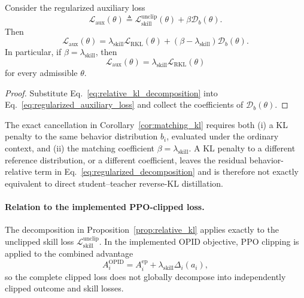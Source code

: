 \documentclass{llmxive}
\begin{document}
\begin{corollary}
\label{cor:matching_kl}
Consider the regularized auxiliary loss
\begin{equation}
 \mathcal L_{\mathrm{aux}}(\theta)
 \triangleq
 \mathcal L_{\mathrm{skill}}^{\mathrm{unclip}}(\theta)
 +
 \beta\mathcal D_b(\theta).
\label{eq:regularized_auxiliary_loss}
\end{equation}
Then
\begin{equation}
 \mathcal L_{\mathrm{aux}}(\theta)
 =
 \lambda_{\mathrm{skill}}
 \mathcal L_{\mathrm{RKL}}(\theta)
 +
 \left(
   \beta-\lambda_{\mathrm{skill}}
 \right)
 \mathcal D_b(\theta).
\label{eq:regularized_decomposition}
\end{equation}
In particular, if
\(\beta=\lambda_{\mathrm{skill}}\), then
\begin{equation*}
 \mathcal L_{\mathrm{aux}}(\theta)
 =
 \lambda_{\mathrm{skill}}
 \mathcal L_{\mathrm{RKL}}(\theta)
\end{equation*}
for every admissible \(\theta\).
\end{corollary}


\begin{proof}
Substitute Eq.~\ref{eq:relative_kl_decomposition} into
Eq.~\ref{eq:regularized_auxiliary_loss} and collect the coefficients of
\(\mathcal D_b(\theta)\).
\end{proof}

The exact cancellation in Corollary~\ref{cor:matching_kl} requires both
(i) a KL penalty to the same behavior distribution \(b_i\), evaluated under
the ordinary context, and
(ii) the matching coefficient
\(\beta=\lambda_{\mathrm{skill}}\).
A KL penalty to a different reference distribution, or a different
coefficient, leaves the residual behavior-relative term in
Eq.~\ref{eq:regularized_decomposition} and is therefore not exactly
equivalent to direct student--teacher reverse-KL distillation.


\paragraph{Relation to the implemented PPO-clipped loss.}

The decomposition in Proposition~\ref{prop:relative_kl} applies exactly to
the unclipped skill loss
\(\mathcal L_{\mathrm{skill}}^{\mathrm{unclip}}\).
In the implemented OPID objective, PPO clipping is applied to the combined
advantage
\[
 A_i^{\mathrm{OPID}}
 =
 A_i^{\mathrm{ep}}
 +
 \lambda_{\mathrm{skill}}\Delta_i(a_i),
\]
so the complete clipped loss does not globally decompose into independently
clipped outcome and skill losses.
\end{document}
